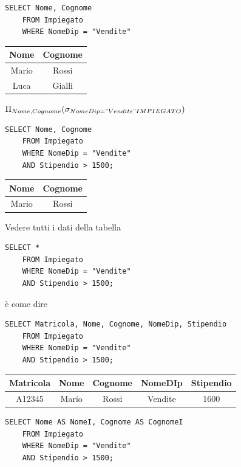 \documentclass{article}
\begin{document}
\begin{itemize}
\begin{lstlisting}[style=sqlstyle]
	SELECT Nome, Cognome
	FROM Impiegato
	WHERE NomeDip = "Vendite"
\end{lstlisting}

\begin{tabular}{|c|c|}
	\hline
	\textbf{Nome} & \textbf{Cognome} \\
	\hline
	Mario & Rossi \\
	\hline
	Luca & Gialli \\
	\hline
\end{tabular}

$\Pi_{Nome,Cognome}(\sigma_{NomeDip = "Vendite" IMPIEGATO})$


\begin{lstlisting}[style=sqlstyle]
	SELECT Nome, Cognome
	FROM Impiegato
	WHERE NomeDip = "Vendite"
	AND Stipendio > 1500;
\end{lstlisting}

\begin{tabular}{|c|c|}
	\hline
	\textbf{Nome} & \textbf{Cognome} \\
	\hline
	Mario & Rossi \\
	\hline
\end{tabular}

Vedere tutti i dati della tabella
\begin{lstlisting}[style=sqlstyle]
	SELECT *
	FROM Impiegato
	WHERE NomeDip = "Vendite"
	AND Stipendio > 1500;
\end{lstlisting}

è come dire 

\begin{lstlisting}[style=sqlstyle]
	SELECT Matricola, Nome, Cognome, NomeDip, Stipendio
	FROM Impiegato
	WHERE NomeDip = "Vendite"
	AND Stipendio > 1500;
\end{lstlisting}

\begin{tabular}{|c|c|c|c|c|}
	\hline
	\textbf{Matricola} & \textbf{Nome} & \textbf{Cognome} & \textbf{NomeDIp} & \textbf{Stipendio} \\
	\hline
	A12345 & Mario & Rossi & Vendite & 1600 \\
	\hline
\end{tabular}

\begin{lstlisting}[style=sqlstyle]
	SELECT Nome AS NomeI, Cognome AS CognomeI
	FROM Impiegato
	WHERE NomeDip = "Vendite"
	AND Stipendio > 1500;
\end{lstlisting}



\end{itemize}
\end{document}

